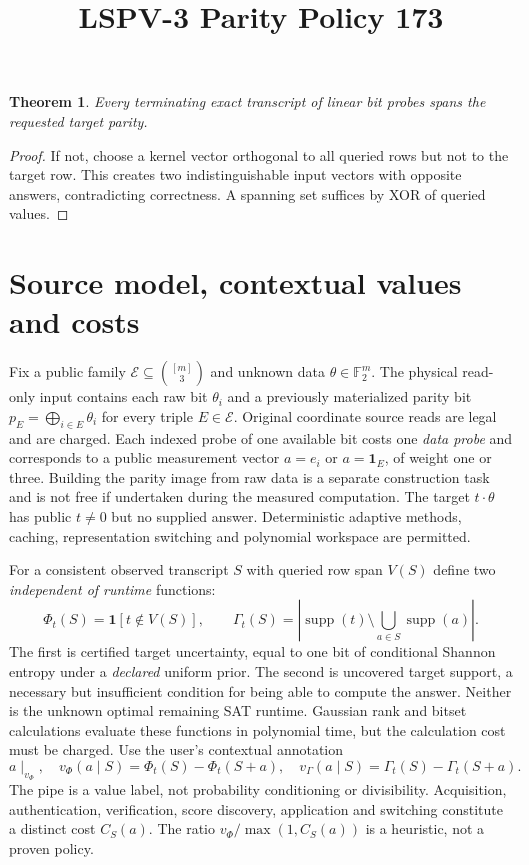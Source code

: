 \documentclass{article}
\title{LSPV-3 Parity Policy 173}
\newtheorem{theorem}{Theorem}
\begin{document}
\maketitle
\begin{theorem} Every terminating exact transcript of linear bit probes spans the requested target parity. \end{theorem}
\begin{proof} If not, choose a kernel vector orthogonal to all queried rows but not to the target row. This creates two indistinguishable input vectors with opposite answers, contradicting correctness. A spanning set suffices by XOR of queried values. \end{proof}

\section{Source model, contextual values and costs}
Fix a public family $\mathcal E\subseteq\binom{[m]}3$ and unknown data $\theta\in\mathbb F_2^m$. The physical read-only input contains each raw bit $\theta_i$ and a previously materialized parity bit $p_E=\bigoplus_{i\in E}\theta_i$ for every triple $E\in\mathcal E$. Original coordinate source reads are legal and are charged. Each indexed probe of one available bit costs one \emph{data probe} and corresponds to a public measurement vector $a=e_i$ or $a=\mathbf1_E$, of weight one or three. Building the parity image from raw data is a separate construction task and is not free if undertaken during the measured computation. The target $t\cdot\theta$ has public $t\ne0$ but no supplied answer. Deterministic adaptive methods, caching, representation switching and polynomial workspace are permitted.

For a consistent observed transcript $S$ with queried row span $V(S)$ define two \emph{independent of runtime} functions:
\[
\Phi_t(S)=\mathbf1[t\notin V(S)],\qquad
\Gamma_t(S)=\left|\operatorname{supp}(t)\setminus
\bigcup_{a\in S}\operatorname{supp}(a)\right|.
\]
The first is certified target uncertainty, equal to one bit of conditional Shannon entropy under a \emph{declared} uniform prior. The second is uncovered target support, a necessary but insufficient condition for being able to compute the answer. Neither is the unknown optimal remaining SAT runtime. Gaussian rank and bitset calculations evaluate these functions in polynomial time, but the calculation cost must be charged. Use the user's contextual annotation
\[
a\mid_{v_\Phi},\quad v_\Phi(a\mid S)=\Phi_t(S)-\Phi_t(S+a),\quad
v_\Gamma(a\mid S)=\Gamma_t(S)-\Gamma_t(S+a).
\]
The pipe is a value label, not probability conditioning or divisibility. Acquisition, authentication, verification, score discovery, application and switching constitute a distinct cost $C_S(a)$. The ratio $v_\Phi/\max(1,C_S(a))$ is a heuristic, not a proven policy.
\end{document}
